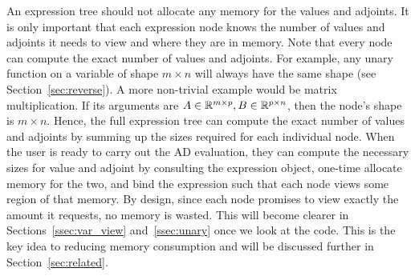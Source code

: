 An expression tree should not allocate any memory for the values and adjoints.
It is only important that each expression node knows 
the number of values and adjoints it needs to view
and where they are in memory.
Note that every node can compute the exact number of values and adjoints.
For example, any unary function on a variable of shape $m \times n$ 
will always have the same shape (see Section~\ref{sec:reverse}).
A more non-trivial example would be matrix multiplication.
If its arguments are $A \in \mathbb{R}^{m \times p}, B \in \mathbb{R}^{p \times n}$, then
the node's shape is $m \times n$.
Hence, the full expression tree can compute the exact number of values and adjoints
by summing up the sizes required for each individual node.
When the user is ready to carry out the AD evaluation, 
they can compute the necessary sizes for value and adjoint by consulting the expression object,
one-time allocate memory for the two, and
bind the expression such that each node views some region of that memory.
By design, since each node promises to view exactly the amount it requests, no memory is wasted.
This will become clearer in Sections~\ref{ssec:var_view} and~\ref{ssec:unary} once we look at the code.
This is the key idea to reducing memory consumption
and will be discussed further in Section~\ref{sec:related}.\@
